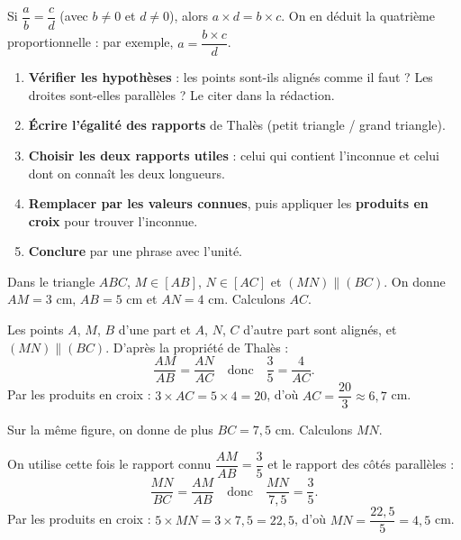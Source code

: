 \documentclass[11pt]{article}
\newcommand{\cle}[1]{{\popxbold\color{popdark}#1}}
\begin{document}
\begin{aretenir}
Si $\dfrac{a}{b} = \dfrac{c}{d}$ (avec $b \neq 0$ et $d \neq 0$), alors $a \times d = b \times c$. On en déduit la \cle{quatrième proportionnelle} : par exemple, $a = \dfrac{b \times c}{d}$.
\end{aretenir}

\begin{methode}
\begin{enumerate}
\item \textbf{Vérifier les hypothèses} : les points sont-ils alignés comme il faut ? Les droites sont-elles parallèles ? Le citer dans la rédaction.
\item \textbf{Écrire l'égalité des rapports} de Thalès (petit triangle / grand triangle).
\item \textbf{Choisir les deux rapports utiles} : celui qui contient l'inconnue et celui dont on connaît les deux longueurs.
\item \textbf{Remplacer par les valeurs connues}, puis appliquer les \textbf{produits en croix} pour trouver l'inconnue.
\item \textbf{Conclure} par une phrase avec l'unité.
\end{enumerate}
\end{methode}

\begin{exemplebox}
Dans le triangle $ABC$, $M \in [AB]$, $N \in [AC]$ et $(MN) \parallel (BC)$. On donne $AM = 3$ cm, $AB = 5$ cm et $AN = 4$ cm. Calculons $AC$.

Les points $A$, $M$, $B$ d'une part et $A$, $N$, $C$ d'autre part sont alignés, et $(MN) \parallel (BC)$. D'après la propriété de Thalès :
\[ \frac{AM}{AB} = \frac{AN}{AC} \quad \text{donc} \quad \frac{3}{5} = \frac{4}{AC}. \]
Par les produits en croix : $3 \times AC = 5 \times 4 = 20$, d'où $AC = \dfrac{20}{3} \approx 6{,}7$ cm.
\end{exemplebox}

\begin{exemplebox}
Sur la même figure, on donne de plus $BC = 7{,}5$ cm. Calculons $MN$.

On utilise cette fois le rapport connu $\dfrac{AM}{AB} = \dfrac{3}{5}$ et le rapport des côtés parallèles :
\[ \frac{MN}{BC} = \frac{AM}{AB} \quad \text{donc} \quad \frac{MN}{7{,}5} = \frac{3}{5}. \]
Par les produits en croix : $5 \times MN = 3 \times 7{,}5 = 22{,}5$, d'où $MN = \dfrac{22{,}5}{5} = 4{,}5$ cm.
\end{exemplebox}
\end{document}
